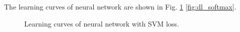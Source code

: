 \documentclass[10pt,twocolumn,letterpaper]{article}
\begin{document}
	The learning curves of neural network are shown in Fig. \ref{fig:dl_svm} \ref{fig:dl_softmax}.
\begin{figure}[htbp]
	\centering
	\caption{Learning curves of neural network with SVM loss.}
	\label{fig:dl_svm}
\end{figure}
\end{document}
